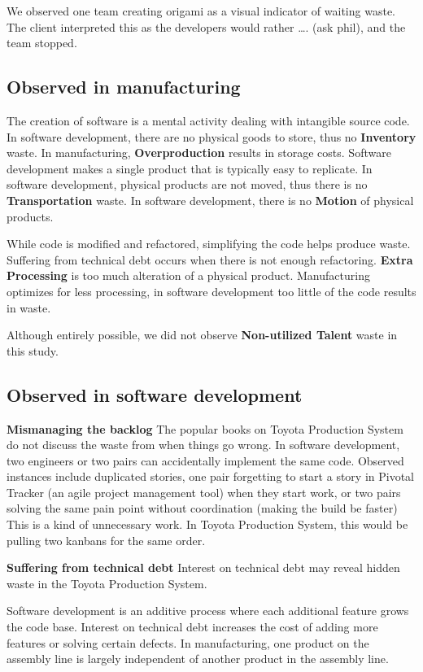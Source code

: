 We observed one team creating origami as a visual indicator of waiting waste. The client interpreted this as the developers would rather …. (ask phil), and the team stopped.
\subsection{Observed in manufacturing}

The creation of software is a mental activity dealing with intangible source code. In software development, there are no physical goods to store, thus no \textbf{Inventory} waste. In manufacturing, \textbf{Overproduction} results in storage costs. Software development makes a single product that is typically easy to replicate. In software development, physical products are not moved, thus there is no \textbf{Transportation} waste. In software development, there is no \textbf{Motion} of physical products. 

While code is modified and refactored, simplifying the code helps produce waste. Suffering from technical debt occurs when there is not enough refactoring.  \textbf{Extra Processing} is too much alteration of a physical product. Manufacturing optimizes for less processing, in software development too little  of the code results in waste. 

Although entirely possible, we did not observe \textbf{Non-utilized Talent} waste in this study.

\subsection{Observed in software development}

\textbf{Mismanaging the backlog}
The popular books on Toyota Production System do not discuss the waste from when things go wrong. In software development, two engineers or two pairs can accidentally implement the same code. Observed instances include duplicated stories, one pair forgetting to start a story in Pivotal Tracker (an agile project management tool) when they start work, or two pairs solving the same pain point without coordination (making the build be faster) This is a kind of unnecessary work. In Toyota Production System, this would be pulling two kanbans for the same order. 

\textbf{Suffering from technical debt}
Interest on technical debt may reveal hidden waste in the Toyota Production System. 

Software development is an additive process where each additional feature grows the code base. Interest on technical debt increases the cost of adding more features or solving certain defects. In manufacturing, one product on the assembly line is largely independent of another product in the assembly line.

